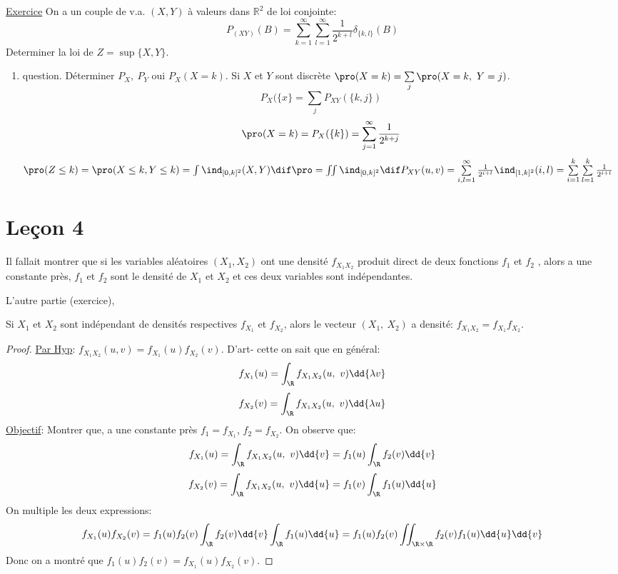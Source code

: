 \underline{Exercice}
On a un couple de v.a. $(X, Y)$ à valeurs dans $\mathbb{R}^2$ de loi conjointe:
$$P_{(XY)}(B)=\sum_{k=1}^\infty\sum_{l=1}^\infty \frac{1}{2^{k+l}}\delta_{\{k, l\}}(B)$$
Determiner la loi de $Z=\sup \{X, Y\}$.
\begin{enumerate}
	\item{question}. Déterminer $P_X,\ P_Y$ oui $P_X(X=k)$.
Si $X$ et $Y$ sont discrète $\pro (X=k)=\sum\limits_j\pro (X=k,\ Y=j)$. $$P_X(\{x\}=\sum\limits_j P_{XY}(\{k, j\})$$
$$\pro (X=k)=P_X(\{k\})=\sum\limits_{j=1}^\infty \frac{1}{2^{k+j}}$$
$\pro (Z\leq k)=\pro (X\leq k, Y\leq k)=\int \ind _{[0, k]^2}(X, Y)\dif \pro =\iint \ind _{[0, k]^2} \dif P_{XY}(u, v)=\sum\limits_{i,l=1}^\infty \frac{1}{2^{i+l}}\ind _{[1, k]^2}(i, l)=\sum\limits_{i=1}^k\sum\limits_{l=1}^k\frac{1}{2^{i+l}}$
\end{enumerate}





\section{Leçon 4} %
\label{sec:lesson_4}

Il fallait montrer que si les variables aléatoires $(X_1, X_2)$ ont une densité $f_{X_1X_2}$ produit direct de deux fonctions $f_1$ et $f_2$ , alors a une constante près, $f_1$ et $f_2$  sont le densité de $X_1$ et $X_2$ et ces deux variables sont indépendantes.

L'autre partie (exercice),

Si $X_1$ et $X_2$ sont indépendant de densités respectives $f_{X_1}$ et $f_{X_2}$, alors le vecteur $(X_1,\ X_2)$ a densité: $f_{X_1X_2}=f_{X_1} f_{X_2}$.

\begin{proof}
	\underline{Par Hyp}: $f_{X_1X_2}(u, v)=f_{X_1}(u) f_{X_2}(v)$. D'art- cette on sait que en général:
	$$f_{X_1}(u)=\int_{\R}f_{X_1X_2}(u,\ v)\dd{\lambda v}$$
	$$f_{X_2}(v)=\int_{\R}f_{X_1X_2}(u,\ v)\dd{\lambda u}$$
	\underline{Objectif}: Montrer que, a une constante près $f_1=f_{X_1}$, $f_2=f_{X_2}$. On observe que:
	$$f_{X_1}(u)=\int_{\R}f_{X_1X_2}(u,\ v)\dd{v}=f_1(u)\int_{\R} f_2(v)\dd{v}$$
	$$f_{X_2}(v)=\int_{\R}f_{X_1X_2}(u,\ v)\dd{u}=f_1(v)\int_\R f_1(u)\dd{u}$$
	On multiple les deux expressions:
	$$f_{X_1}(u)f_{X_2}(v)=f_1(u)f_2(v)\int_\R f_2(v)\dd{v}\int_\R f_1(u)\dd{u}=f_1(u)f_2(v)\iint_{\R\times\R} f_2(v) f_1(u)\dd{u}\dd{v}$$
	Donc on a montré que $f_1(u)f_2(v)=f_{X_1}(u)f_{X_2}(v)$.
\end{proof}


